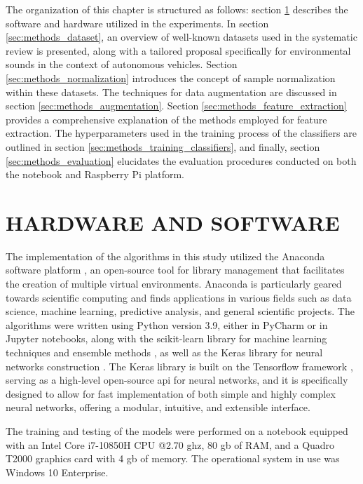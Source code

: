 The organization of this chapter is structured as follows: section \ref{sec:methods_HWSW} describes the software and hardware utilized in the experiments. In section \ref{sec:methods_dataset}, an overview of well-known datasets used in the systematic review is presented, along with a tailored proposal specifically for environmental sounds in the context of autonomous vehicles. Section \ref{sec:methods_normalization} introduces the concept of sample normalization within these datasets. The techniques for data augmentation are discussed in section \ref{sec:methods_augmentation}. Section \ref{sec:methods_feature_extraction} provides a comprehensive explanation of the methods employed for feature extraction. The hyperparameters used in the training process of the classifiers are outlined in section \ref{sec:methods_training_classifiers}, and finally, section \ref{sec:methods_evaluation} elucidates the evaluation procedures conducted on both the notebook and Raspberry Pi platform.


\section{HARDWARE AND SOFTWARE}
\label{sec:methods_HWSW}

The implementation of the algorithms in this study utilized the Anaconda software platform \cite{Anaconda86}, an open-source tool for library management that facilitates the creation of multiple virtual environments. Anaconda is particularly geared towards scientific computing and finds applications in various fields such as data science, machine learning, predictive analysis, and general scientific projects. The algorithms were written using Python version 3.9, either in PyCharm or in Jupyter notebooks, along with the scikit-learn library for machine learning techniques and ensemble methods \cite{scikitle61}, as well as the Keras library for neural networks construction \cite{KerasDee32}. The Keras library is built on the Tensorflow framework \cite{TensorFl23}, serving as a high-level open-source \gls{api} for neural networks, and it is specifically designed to allow for fast implementation of both simple and highly complex neural networks, offering a modular, intuitive, and extensible interface. 

The training and testing of the models were performed on a notebook equipped with an Intel\textregistered{} Core\texttrademark{} i7-10850H CPU @2.70 \gls{g}\gls{hz}, 80 \gls{g}\gls{b} of RAM, and a Quadro T2000 graphics card with 4 \gls{g}\gls{b} of memory. The operational system in use was Windows 10 Enterprise.

